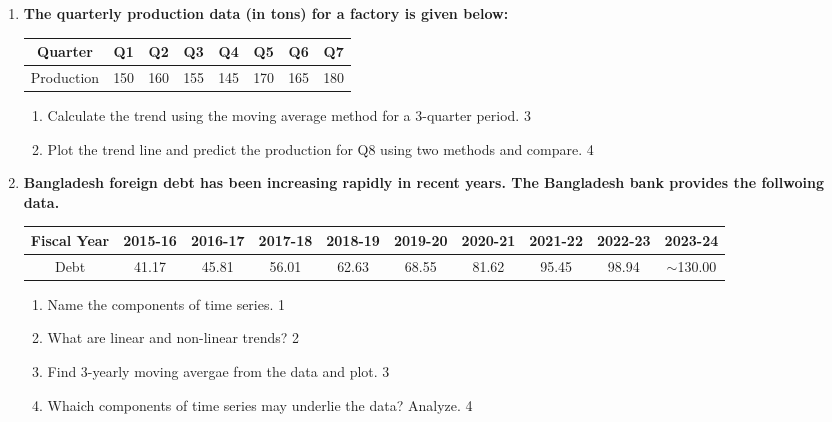 \documentclass[a4paper,oneside]{book}
\begin{document}
\begin{enumerate}
\item
\textbf{The quarterly production data (in tons) for a factory is given below:}

\begin{table}[h]
\centering
\begin{tabular}{cccccccc}
Quarter    & Q1     & Q2     & Q3     & Q4     & Q5     & Q6     & Q7     \\ \hline
Production & 150    & 160    & 155    & 145    & 170    & 165    & 180    \\
\end{tabular}
\end{table}

\begin{enumerate}
\item
Calculate the trend using the moving average method for a 3-quarter period. \hfill 3
\item
Plot the trend line and predict the production for Q8 using two methods 
and compare. \hfill 4
\end{enumerate}


  
     \item
	  \textbf{Bangladesh foreign debt has been increasing rapidly in recent years. The Bangladesh bank provides the follwoing data.}
	  
	  \begin{table}[h]
	  \centering
\begin{tabular}{c|c|c|c|c|c|c|c|c|c}
Fiscal Year & 2015-16 & 2016-17 & 2017-18 & 2018-19 & 2019-20 & 2020-21 & 2021-22 & 2022-23 & 2023-24 \\ \hline
Debt & 41.17 & 45.81 & 56.01 & 62.63 & 68.55 & 81.62 & 95.45 & 98.94 & $\sim$130.00
\end{tabular}
\end{table}
  
  \begin{enumerate}
    \item
	Name the components of time series. \hfill 1
    \item
	What are linear and non-linear trends? \hfill 2
    \item  
	Find 3-yearly moving avergae from the data and plot. \hfill 3
    \item
	Whaich components of time series may underlie the data? Analyze. \hfill 4
  \end{enumerate}


\end{enumerate}
\end{document}
